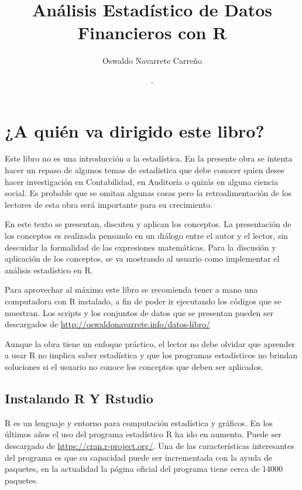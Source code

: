 \documentclass[letterpaper,]{book}
\title{Análisis Estadístico de Datos Financieros con R}
\author{Oswaldo Navarrete Carreño}
\date{.}
\begin{document}
\maketitle

{
\setcounter{tocdepth}{3}
\tableofcontents
}
\hypertarget{a-quien-va-dirigido-este-libro}{%
\chapter{¿A quién va dirigido este libro?}\label{a-quien-va-dirigido-este-libro}}

Este libro no es una introducción a la estadística. En la presente obra se intenta hacer un repaso de algunos temas de estadistica que debe conocer quien desee hacer investigación en Contabilidad, en Auditoría o quizás en alguna ciencia social. Es probable que se omitan algunas cosas pero la retroalimentación de los lectores de esta obra será importante para su crecimiento.

En este texto se presentan, discuten y aplican los conceptos. La presentación de los conceptos es realizada pensando en un diálogo entre el autor y el lector, sin descuidar la formalidad de las expresiones matemáticas. Para la discusión y aplicación de los conceptos, se va mostrando al usuario como implementar el análisis estadístico en R.

Para aprovechar al máximo este libro se recomienda tener a mano una computadora con R instalado, a fin de poder ir ejecutando los códigos que se muestran. Los scripts y los conjuntos de datos que se presentan pueden ser descargados de \url{http://oswaldonavarrete.info/datos-libro/}

Aunque la obra tiene un enfoque práctico, el lector no debe olvidar que aprender a usar R no implica saber estadística y que los programas estadísticos no brindan soluciones si el usuario no conoce los conceptos que deben ser aplicados.

\hypertarget{instalando-r-y-rstudio}{%
\section{Instalando R Y Rstudio}\label{instalando-r-y-rstudio}}

R es un lenguaje y entorno para computación estadística y gráficos. En los últimos años el uso del programa estadístico R ha ido en aumento. Puede ser descargado de \url{https://cran.r-project.org/}. Una de las características interesantes del programa es que su capacidad puede ser incrementada con la ayuda de paquetes, en la actualidad la página oficial del programa tiene cerca de 14000 paquetes.
\end{document}
